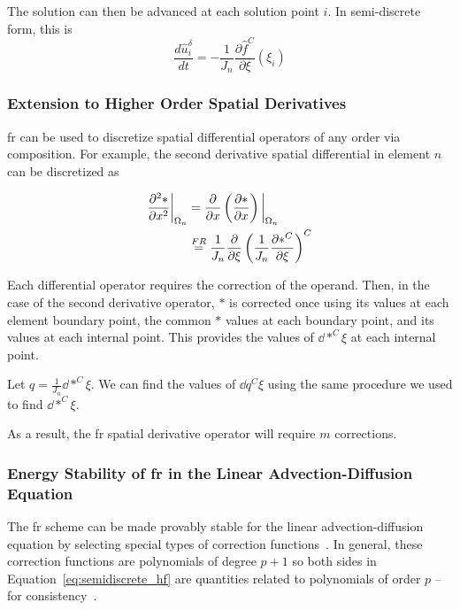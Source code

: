The solution can then be advanced at each solution point $i$. In semi-discrete form, this is
\begin{equation}\label{eq:semidiscrete_hf}
\frac{d \hat{u}_i^\delta}{d t} = - \frac{1}{J_n}\frac{\partial \hat{f}^C}{\partial \xi}(\xi_i)
\end{equation}

\subsubsection{Extension to Higher Order Spatial Derivatives}

\gls{fr} can be used to discretize spatial differential operators of any order via composition. For example, the second derivative spatial differential in element $n$ can be discretized as

\begin{equation}
\begin{aligned}
\frac{\partial^2 *}{\partial x^2}\bigg|_{\Omega_n} &= {\frac{\partial }{\partial x}}\left({\frac{\partial *}{\partial x}}\right)\bigg|_{\Omega_n}\\
& \stackrel{FR}{=} \frac{1}{J_n} {\frac{\partial }{\partial \xi}}\left( \frac{1}{J_n} {\frac{\partial *^C}{\partial \xi}}\right)^C
\end{aligned}
\end{equation}

Each differential operator requires the correction of the operand. Then, in the case of the second derivative operator, $*$ is corrected once using its values at each element boundary point, the common $*$ values at each boundary point, and its values at each internal point. This provides the values of $\dd{*^C}{\xi}$ at each internal point.

Let $q = \frac{1}{J_n} \dd{*^C}{\xi}$. We can find the values of $\dd{q^C}{\xi}$ using the same procedure we used to find $\dd{*^C}{\xi}$.

As a result, the  \gls{fr} spatial derivative operator will require $m$ corrections.

\subsubsection{Energy Stability of \gls{fr} in the Linear Advection-Diffusion Equation}
The \gls{fr} scheme can be made provably stable for the linear advection-diffusion equation by selecting special types of correction functions~\cite{castonguay2013energy}. In general, these correction functions are polynomials of degree $p+1$ so both sides in Equation~\eqref{eq:semidiscrete_hf} are quantities related to polynomials of order $p$ --for consistency~\cite{huynh2007flux}.

